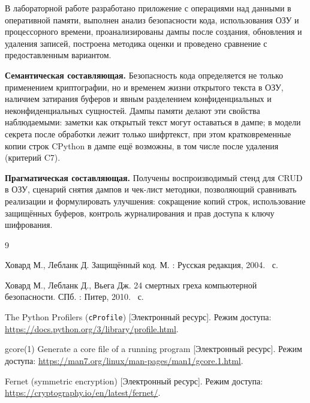 
В лабораторной работе разработано приложение с операциями над данными в оперативной памяти, выполнен анализ безопасности кода, использования ОЗУ и процессорного времени, проанализированы дампы после создания, обновления и удаления записей, построена методика оценки и проведено сравнение с предоставленным вариантом.

\textbf{Семантическая составляющая.} Безопасность кода определяется не только применением криптографии, но и временем жизни открытого текста в ОЗУ, наличием затирания буферов и явным разделением конфиденциальных и неконфиденциальных сущностей. Дампы памяти делают эти свойства наблюдаемыми: заметки как открытый текст могут оставаться в дампе; в модели секрета после обработки лежит только шифртекст, при этом кратковременные копии строк CPython в дампе ещё возможны, в том числе после удаления (критерий C7).

\textbf{Прагматическая составляющая.} Получены воспроизводимый стенд для CRUD в ОЗУ, сценарий снятия дампов и чек-лист методики, позволяющий сравнивать реализации и формулировать улучшения: сокращение копий строк, использование защищённых буферов, контроль журналирования и прав доступа к ключу шифрования.

\begin{thebibliography}{9}

	Ховард М., Лебланк Д. Защищённый код. \mdash  М. : Русская редакция, 2004. ~с.

	Ховард М., Лебланк Д., Вьега Дж. 24 смертных греха компьютерной безопасности. \mdash  СПб. : Питер, 2010. ~с.

	The Python Profilers (\texttt{cProfile}) [Электронный ресурс]. \mdash  Режим доступа: \url{https://docs.python.org/3/library/profile.html}.

	gcore(1) \mdash  Generate a core file of a running program [Электронный ресурс]. \mdash  Режим доступа: \url{https://man7.org/linux/man-pages/man1/gcore.1.html}.

	Fernet (symmetric encryption) [Электронный ресурс]. \mdash  Режим доступа: \url{https://cryptography.io/en/latest/fernet/}.
\end{thebibliography}
